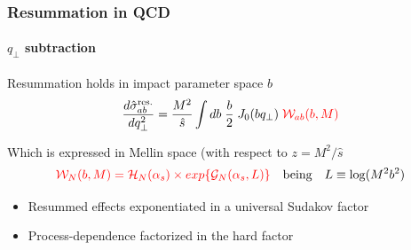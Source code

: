 \documentclass[aspectratio=43]{beamer}
\begin{document}
\begin{frame}

	\frametitle{Resummation in QCD}
	\framesubtitle{$q_{\perp}$ subtraction}
	
	Resummation holds in impact parameter space $b$
	\begin{equation}
		\frac{d\hat{\sigma}_{ab}^{\textrm{res.}}}{dq_{\perp}^{2}} = \frac{M^{2}}{\hat{s}} \int db \; \frac{b}{2} \; J_{0}(b q_{\perp}) \; {\color{red} \mathcal{W}_{ab}(b, M)} \nonumber
	\end{equation}
	
	Which is expressed in Mellin space (with respect to $z = M^{2}/\hat{s}$
	\begin{equation}
		{\color{red} \mathcal{W}_{N}(b, M) = \mathcal{H}_{N}(\alpha_{s}) \times exp\{\mathcal{G}_{N}(\alpha_{s}, L)\}} \quad\textrm{being}\quad L \equiv \log(M^{2}b^{2}) \nonumber
	\end{equation}

	\begin{itemize}
		\item Resummed effects exponentiated in a universal Sudakov factor
		\item Process-dependence factorized in the hard factor
	\end{itemize}

	
\end{frame}

\begin{frame}


\end{frame}
\end{document}
